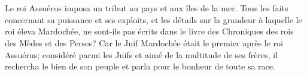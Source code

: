 \chapter{}

\verse Le roi Assuérus imposa un tribut au pays et aux îles de la mer. 
\verse Tous les faits concernant sa puissance et ses exploits, et les détails sur la grandeur à laquelle le roi éleva Mardochée, ne sont-ils pas écrits dans le livre des Chroniques des rois des Mèdes et des Perses? 
\verse Car le Juif Mardochée était le premier après le roi Assuérus; considéré parmi les Juifs et aimé de la multitude de ses frères, il rechercha le bien de son peuple et parla pour le bonheur de toute sa race. 
